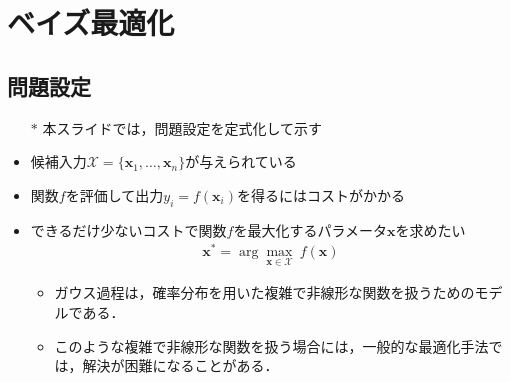 \documentclass[dvipdfmx, 10.5pt]{beamer}
\begin{document}
\section{ベイズ最適化}




\subsection{問題設定}
\begin{frame}{\insertsubsection}
	\begin{itemize}
		\item[$\ast$] 本スライドでは，問題設定を定式化して示す
		\item 候補入力$\mathcal{X} = \{ \bm x_1, \ldots, \bm x_n \}$が与えられている

		\item 関数$f$を評価して出力$y_i = f(\bm x_i)$を得るにはコストがかかる

		\item できるだけ少ないコストで関数$f$を最大化するパラメータ$\bm x$を求めたい
		\begin{align*}
			\bm x^* = \arg \max_{\bm x \in \mathcal{X}} ~ f(\bm x)
		\end{align*}
		\begin{itemize}
			\item ガウス過程は，確率分布を用いた複雑で非線形な関数を扱うためのモデルである．
			\item このような複雑で非線形な関数を扱う場合には，一般的な最適化手法では，解決が困難になることがある．
		\end{itemize}
	\end{itemize}
\end{frame}
\end{document}
